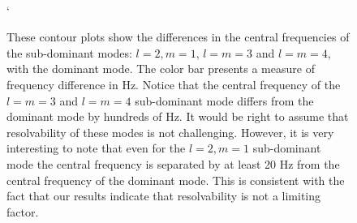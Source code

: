 \begin{figure}[hpt!]
\centering
{}
\\
`

\caption{\label{fig:contourPlot}These contour plots show the differences in the central frequencies of the sub-dominant modes: $l=2,m=1$, $l=m=3$ and $l=m=4$, with the dominant mode. The color bar presents a measure of frequency difference in Hz. Notice that the central frequency of the $l=m=3$ and $l=m=4$ sub-dominant mode differs from the dominant mode by hundreds of Hz. It would be right to assume that resolvability of these modes is not challenging. However, it is very interesting to note that even for the $l=2, m=1$ sub-dominant mode the central frequency is separated by at least 20 Hz from the central frequency of the dominant mode. This is consistent with the fact that our results indicate that resolvability is not a limiting factor.}
\end{figure}


